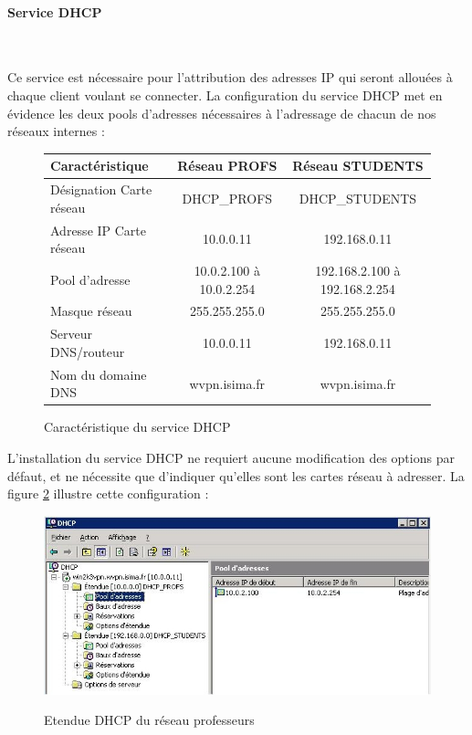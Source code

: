 \paragraph{Service DHCP}
~

Ce service est nécessaire pour l'attribution des adresses IP qui seront allouées à chaque client voulant se connecter. La configuration du service DHCP met en évidence les deux pools d'adresses nécessaires à l'adressage de chacun de nos réseaux internes :

\begin{figure}[H]
	\begin{center}
		\begin{tabular}{l|c|c}
			Caractéristique & Réseau PROFS & Réseau STUDENTS \\
			\hline
			Désignation Carte réseau & DHCP\_PROFS & DHCP\_STUDENTS \\
			Adresse IP Carte réseau & 10.0.0.11 & 192.168.0.11 \\
			Pool d'adresse & 10.0.2.100 à 10.0.2.254 & 192.168.2.100 à 192.168.2.254 \\
			Masque réseau & 255.255.255.0 & 255.255.255.0 \\
			Serveur DNS/routeur & 10.0.0.11 & 192.168.0.11 \\
			Nom du domaine DNS & wvpn.isima.fr & wvpn.isima.fr \\
		\end{tabular}
	\end{center}
	\caption{Caractéristique du service DHCP}
	\label{service_DHCP}
\end{figure}

L'installation du service DHCP ne requiert aucune modification des options par défaut, et ne nécessite que d'indiquer qu'elles sont les cartes réseau à adresser. La figure \ref{Screen_client_dhcp} illustre cette configuration :

\begin{figure}[H]
	\begin{center}
	\includegraphics[width=\textwidth]{partie_2/screen_windows/dhcp.JPG}\\
	\end{center}
	\caption{Etendue DHCP du réseau professeurs}
	\label{Screen_client_dhcp}
\end{figure}
~

